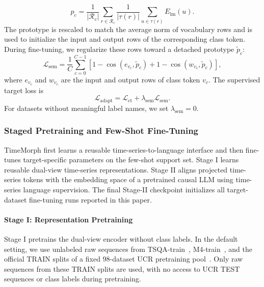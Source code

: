\documentclass[10pt,journal,compsoc]{IEEEtran}
\begin{document}
\begin{equation}
\label{eq:semantic-prototype}
p_c
=
\frac{1}{|\mathcal{R}_c|}
\sum_{r\in\mathcal{R}_c}
\frac{1}{|\tau(r)|}
\sum_{u\in\tau(r)}
E_{\mathrm{lm}}(u).
\end{equation}
The prototype is rescaled to match the average norm of vocabulary rows and is used to initialize the input and output rows of the corresponding class token.
During fine-tuning, we regularize these rows toward a detached prototype $\tilde{p}_c$:
\begin{equation}
\label{eq:semantic-row-reg}
\mathcal{L}_{\mathrm{sem}}
=
\frac{1}{C}
\sum_{c=0}^{C-1}
\left[
1-\cos(e_{v_c},\tilde{p}_c)
+
1-\cos(w_{v_c},\tilde{p}_c)
\right],
\end{equation}
where $e_{v_c}$ and $w_{v_c}$ are the input and output rows of class token $v_c$.
The supervised target loss is
\begin{equation}
\label{eq:adapt-loss}
\mathcal{L}_{\mathrm{adapt}}
=
\mathcal{L}_{\mathrm{ct}}
+
\lambda_{\mathrm{sem}}\mathcal{L}_{\mathrm{sem}}.
\end{equation}
For datasets without meaningful label names, we set $\lambda_{\mathrm{sem}}=0$.

\subsubsection{Staged Pretraining and Few-Shot Fine-Tuning}
\label{sec:pretraining-adaptation}
TimeMorph first learns a reusable time-series-to-language interface and then fine-tunes target-specific parameters on the few-shot support set.
Stage I learns reusable dual-view time-series representations.
Stage II aligns projected time-series tokens with the embedding space of a pretrained causal LLM using time-series language supervision.
The final Stage-II checkpoint initializes all target-dataset fine-tuning runs reported in this paper.

\paragraph{Stage I: Representation Pretraining}
Stage I pretrains the dual-view encoder without class labels.
In the default setting, we use unlabeled raw sequences from TSQA-train~\cite{wang2025chattime}, M4-train~\cite{makridakis2020m4}, and the official TRAIN splits of a fixed 98-dataset UCR pretraining pool~\cite{dau2019ucr}. Only raw sequences from these TRAIN splits are used, with no access to UCR TEST sequences or class labels during pretraining.
\end{document}
